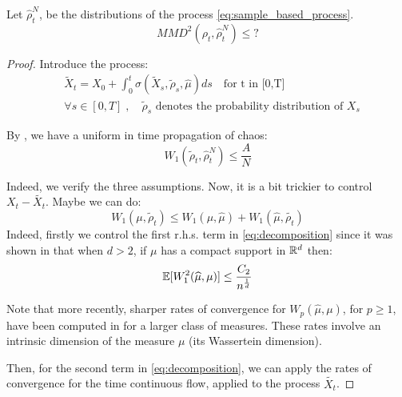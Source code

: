 

\begin{proposition} Let $\widehat{\rho}_t^N$, be the distributions of the process \eqref{eq:sample_based_process}. %
	\begin{equation}
	MMD^2(\rho_t,\widehat{\rho}_t^N)\le ?%
	\end{equation}
\end{proposition}
\begin{proof} 
	Introduce the process:
	\begin{align}\label{eq:intermediary_process}
	&\widetilde{X}_t=X_{0}+\int_{0}^t \sigma(\widetilde{X}_s, \widetilde{\rho}_s, \widehat{\mu})ds \quad \text{for t in [0,T]}\\
	&\forall s \in [0,T]\;,\quad \widetilde{\rho}_s \text{ denotes the probability distribution of } X_s
	\end{align}
	\begin{lemma}
		By \cite{durmus2018elementary}, we have a uniform in time propagation of chaos:
		\begin{equation}
		W_1(\widetilde{\rho}_t,\widehat{\rho}_t^N)\le \frac{A}{N}
		\end{equation}
	\end{lemma}
	Indeed, we verify the three assumptions. 
	Now, it is a bit trickier to control $X_t-\widetilde{X_t}$. Maybe we can do:
	\begin{equation}\label{eq:decomposition}
	W_1(\mu, \widetilde{\rho}_t)\le W_1(\mu, \widehat{\mu})+W_1(\widehat{\mu}, \widetilde{\rho_t})
	\end{equation}
	Indeed, firstly we control the first r.h.s. term in \eqref{eq:decomposition} since it was shown in \cite{dudley1969speed} that when $d > 2$, if $\mu$ has a compact support in ${{\mathbb R}}^d$ then:
	\begin{equation}
	{{\mathbb E}}[W_1^2(\widehat{\mu},\mu)]\le \frac{C_2}{n^{\frac{1}{d}}}
	\end{equation}
	\begin{remark}
		Note that more recently, sharper rates of convergence  for $W_p(\widehat{ \mu}, \mu)$, for $p\ge 1$, have been computed in \cite{weed2017sharp} for a larger class of measures. These rates involve an intrinsic dimension of the measure $\mu$ (its Wassertein dimension). 
	\end{remark}
	Then, for the second term in \eqref{eq:decomposition}, we can apply the rates of convergence for the time continuous flow, applied to the process $\widetilde{X_t}$.
\end{proof}